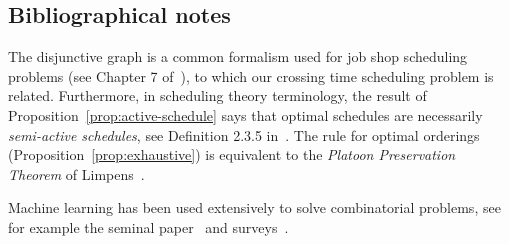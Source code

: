 \documentclass[a4paper]{article}
\theoremstyle{definition}
\theoremstyle{plain}
\begin{document}
\newpage

\subsection*{Bibliographical notes}

The disjunctive graph is a common formalism used for job shop scheduling
problems (see Chapter 7 of~\cite{pinedoSchedulingTheoryAlgorithms2016}), to
which our crossing time scheduling problem is related. Furthermore, in
scheduling theory terminology, the result of
Proposition~\ref{prop:active-schedule} says that optimal schedules are
necessarily \textit{semi-active schedules}, see Definition 2.3.5
in~\cite{pinedoSchedulingTheoryAlgorithms2016}.
%
The rule for optimal orderings (Proposition~\ref{prop:exhaustive}) is equivalent
to the \textit{Platoon Preservation Theorem} of
Limpens~\cite{limpensOnlinePlatoonForming2023}.

Machine learning has been used extensively to solve combinatorial problems, see
for example the seminal paper~\cite{belloNeuralCombinatorialOptimization2017} and surveys~\cite{bengioMachineLearningCombinatorial2020,mazyavkinaReinforcementLearningCombinatorial2020}.



\end{document}
